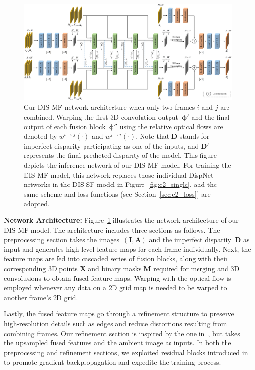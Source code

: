 \begin{figure}[t]
    \begin{center}
        \includegraphics[width=1.0\linewidth]{images/chapter2/figures/Fig3.jpg}
    \end{center}
   \caption{Our DIS-MF network architecture when only two frames $i$ and $j$ are combined. Warping the first 3D convolution output~$\boldsymbol{\phi'}$ and the final output of each fusion block~$\boldsymbol{\phi''}$ using the relative optical flows are denoted by $w^{i \rightarrow j}(\cdot)$ and $w^{j \rightarrow i}(\cdot)$. Note that $\boldsymbol{D}$ stands for imperfect disparity participating as one of the inputs, and $\boldsymbol{D'}$ represents the final predicted disparity of the model. This figure depicts the inference network of our DIS-MF model. For training the DIS-MF model, this network replaces those individual DispNet~\cite{mayer2016large} networks in the DIS-SF model in Figure~\ref{fig:c2_single}, and the same scheme and loss functions (see Section~\ref{sec:c2_loss}) are adopted.}
    \label{fig:c2_architecture}
\end{figure}

\bigbreak\noindent\textbf{Network Architecture:} Figure~\ref{fig:c2_architecture} illustrates the network architecture of our DIS-MF model. The architecture includes three sections as follows. The preprocessing section takes the images~$(\boldsymbol{I},\boldsymbol{A})$ and the imperfect disparity~$\boldsymbol{D}$ as input and generates high-level feature maps for each frame individually. Next, the feature maps are fed into cascaded series of fusion blocks, along with their corresponding 3D points $\boldsymbol{X}$ and binary masks $\boldsymbol{M}$ required for merging and 3D convolutions to obtain fused feature maps. Warping with the optical flow is employed whenever any data on a 2D grid map is needed to be warped to another frame's 2D grid.

Lastly, the fused feature maps go through a refinement structure to preserve high-resolution details such as edges and reduce distortions resulting from combining frames. Our refinement section is inspired by the one in~\cite{zhang2018activestereonet}, but takes the upsampled fused features and the ambient image as inputs. In both the preprocessing and refinement sections, we exploited residual blocks introduced in~\cite{he2016deep} to promote gradient backpropagation and expedite the training process.

